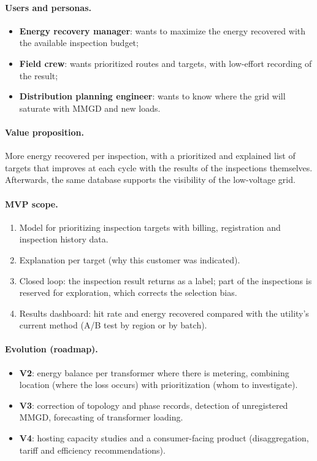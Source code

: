 \documentclass[10pt,a4paper,oneside]{article}
\begin{document}
\paragraph{Users and personas.}
\begin{itemize}
  \item \textbf{Energy recovery manager}: wants to maximize the energy
    recovered with the available inspection budget;
  \item \textbf{Field crew}: wants prioritized routes and targets, with
    low-effort recording of the result;
  \item \textbf{Distribution planning engineer}: wants to know where the
    grid will saturate with MMGD and new loads.
\end{itemize}

\paragraph{Value proposition.}
More energy recovered per inspection, with a prioritized and explained list
of targets that improves at each cycle with the results of the inspections
themselves. Afterwards, the same database supports the visibility of the
low-voltage grid.

\paragraph{MVP scope.}
\begin{enumerate}
  \item Model for prioritizing inspection targets with billing,
    registration and inspection history data.
  \item Explanation per target (why this customer was indicated).
  \item Closed loop: the inspection result returns as a label; part of the
    inspections is reserved for exploration, which corrects the selection
    bias.
  \item Results dashboard: hit rate and energy recovered compared with the
    utility's current method (A/B test by region or by batch).
\end{enumerate}

\paragraph{Evolution (roadmap).}
\begin{itemize}
  \item \textbf{V2}: energy balance per transformer where there is metering,
    combining location (where the loss occurs) with prioritization (whom to
    investigate).
  \item \textbf{V3}: correction of topology and phase records, detection of
    unregistered MMGD, forecasting of transformer loading.
  \item \textbf{V4}: hosting capacity studies and a consumer-facing product
    (disaggregation, tariff and efficiency recommendations).
\end{itemize}
\end{document}
